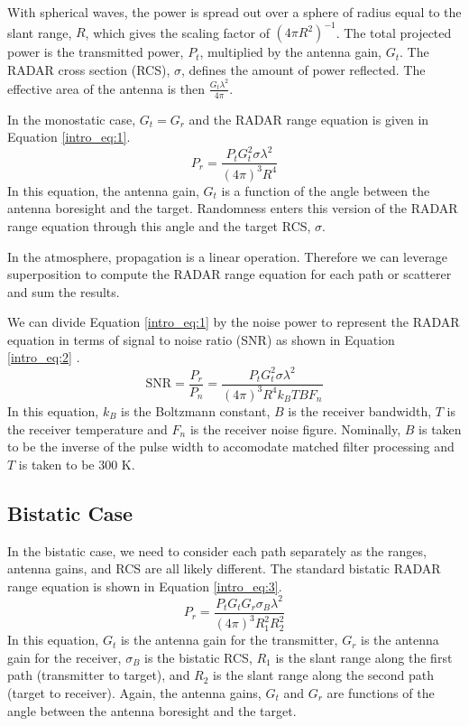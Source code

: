 With spherical waves, the power is spread out over a sphere of radius equal to the slant range, $R$, which gives the scaling factor of $\left( 4\pi R^2 \right)^{-1}$. The total projected power is the transmitted power, $P_t$, multiplied by the antenna gain, $G_t$. The RADAR cross section (RCS), $\sigma$, defines the amount of power reflected. The effective area of the antenna is then $\frac{G_t\lambda^2}{4\pi}$.

In the monostatic case, $G_t = G_r$ and the RADAR range equation is given in Equation \ref{intro_eq:1}.
  \begin{equation}
  \label{intro_eq:1}
 P_r = \frac{P_tG_t^2\sigma\lambda^2}{\left(4\pi\right)^3R^4}
  \end{equation}
In this equation, the antenna gain, $G_t$ is a function of the angle between the antenna boresight and the target. Randomness enters this version of the RADAR range equation through this angle and the target RCS, $\sigma$.

In the atmosphere, propagation is a linear operation. Therefore we can leverage superposition to compute the RADAR range equation for each path or scatterer and sum the results.

We can divide Equation \ref{intro_eq:1} by the noise power to represent the RADAR equation in terms of signal to noise ratio (SNR) as shown in Equation \ref{intro_eq:2} \cite{skolnik_handbook}.
\begin{equation}
    \label{intro_eq:2}
\text{SNR} = \frac{P_r}{P_n} = \frac{P_tG_t^2\sigma\lambda^2}{\left(4\pi\right)^3 R^4k_BTBF_n}
\end{equation}
In this equation, $k_B$ is the Boltzmann constant, $B$ is the receiver bandwidth, $T$ is the receiver temperature and $F_n$ is the receiver noise figure. Nominally, $B$ is taken to be the inverse of the pulse width to accomodate matched filter processing and $T$ is taken to be $300$ K.

\subsection{Bistatic Case}
In the bistatic case, we need to consider each path separately as the ranges, antenna gains, and RCS are all likely different. The standard bistatic RADAR range equation is shown in Equation \ref{intro_eq:3}.
  \begin{equation}
  \label{intro_eq:3}
 P_r = \frac{P_tG_tG_r\sigma_B\lambda^2}{\left(4\pi\right)^3R_1^2R_2^2}
  \end{equation}
In this equation, $G_t$ is the antenna gain for the transmitter, $G_r$ is the antenna gain for the receiver, $\sigma_B$ is the bistatic RCS, $R_1$ is the slant range along the first path (transmitter to target), and $R_2$ is the slant range along the second path (target to receiver). Again, the antenna gains, $G_t$ and $G_r$ are functions of the angle between the antenna boresight and the target.

